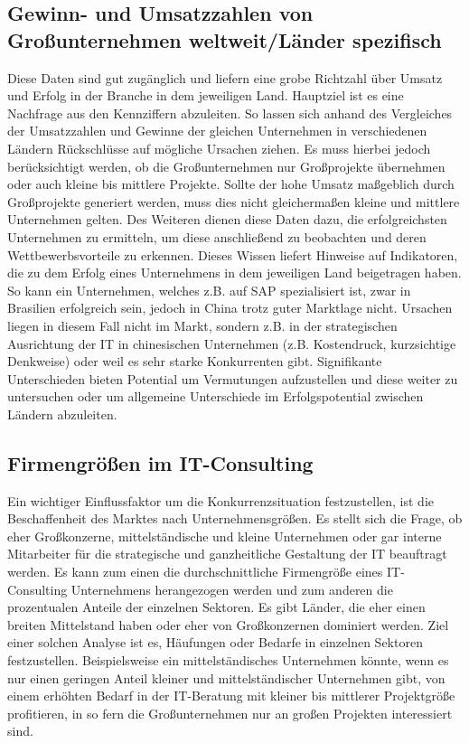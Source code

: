 \subsection{Gewinn- und Umsatzzahlen von Großunternehmen weltweit/Länder spezifisch}
Diese Daten sind gut zugänglich und liefern eine grobe Richtzahl über Umsatz und Erfolg in der Branche in dem jeweiligen Land. Hauptziel ist es eine Nachfrage aus den Kennziffern abzuleiten. So lassen sich anhand des Vergleiches der Umsatzzahlen und Gewinne der gleichen Unternehmen in verschiedenen Ländern Rückschlüsse auf mögliche Ursachen ziehen.
 Es muss hierbei jedoch berücksichtigt werden, ob die Großunternehmen nur Großprojekte übernehmen oder auch kleine bis mittlere Projekte. Sollte der hohe Umsatz maßgeblich durch Großprojekte generiert werden, muss dies nicht gleichermaßen kleine und mittlere Unternehmen gelten.
Des Weiteren dienen diese Daten dazu, die erfolgreichsten Unternehmen zu ermitteln, um diese anschließend zu beobachten und deren Wettbewerbsvorteile zu erkennen. Dieses Wissen liefert Hinweise auf Indikatoren, die zu dem Erfolg eines Unternehmens in dem jeweiligen Land beigetragen haben.
 So kann ein Unternehmen, welches z.B. auf SAP spezialisiert ist, zwar in Brasilien erfolgreich sein, jedoch in China trotz guter Marktlage nicht. Ursachen liegen in diesem Fall nicht im Markt, sondern z.B. in der strategischen Ausrichtung der IT in chinesischen Unternehmen (z.B. Kostendruck, kurzsichtige Denkweise) oder weil es sehr starke Konkurrenten gibt.
Signifikante Unterschieden bieten Potential um Vermutungen aufzustellen und diese weiter zu untersuchen oder um allgemeine Unterschiede im Erfolgspotential zwischen Ländern abzuleiten. 

 \subsection{Firmengrößen im IT-Consulting}
Ein wichtiger Einflussfaktor um die Konkurrenzsituation festzustellen, ist die Beschaffenheit des Marktes nach Unternehmensgrößen.
 Es stellt sich die Frage, ob eher Großkonzerne, mittelständische und kleine  Unternehmen oder gar interne Mitarbeiter für die strategische und ganzheitliche Gestaltung der IT beauftragt werden.
Es kann zum einen die durchschnittliche Firmengröße eines IT-Consulting Unternehmens herangezogen werden  und zum anderen die prozentualen Anteile der einzelnen Sektoren.  Es gibt Länder, die eher einen breiten Mittelstand haben oder eher von Großkonzernen dominiert werden. 
Ziel einer solchen Analyse ist es, Häufungen oder Bedarfe in einzelnen Sektoren festzustellen. 
Beispielsweise ein mittelständisches Unternehmen könnte, wenn es nur einen geringen Anteil kleiner und mittelständischer Unternehmen gibt, von einem erhöhten Bedarf in der IT-Beratung mit kleiner bis mittlerer Projektgröße profitieren, in so fern die Großunternehmen nur an großen Projekten interessiert sind.

